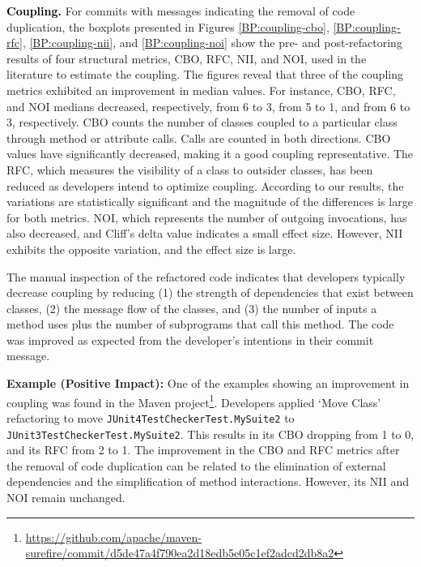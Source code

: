 \noindent\textbf{\textcolor{black}{Coupling.}} For commits with messages indicating the removal of code duplication, the boxplots presented in Figures \ref{BP:coupling-cbo}, \ref{BP:coupling-rfc}, \ref{BP:coupling-nii}, and \ref{BP:coupling-noi} show the pre- and post-refactoring results of four structural metrics, \ie CBO, RFC, NII, and NOI, used in the literature to estimate the coupling. The figures reveal that three of the coupling metrics exhibited an improvement in median values. For instance, CBO, RFC, and NOI medians decreased, respectively, from 6 to 3, from 5 to 1, and from 6 to 3, respectively. CBO counts the number of classes coupled to a particular class through method or attribute calls. Calls are counted in both directions. CBO values have significantly decreased, making it a good coupling representative.  The RFC, which measures the visibility of a class to outsider classes, has been reduced as developers intend to optimize coupling. According to our results, the variations are statistically significant and the magnitude of the differences is large for both metrics.  NOI, which represents the number of outgoing invocations, has also decreased, and Cliff’s delta value
indicates a small effect size. However, NII exhibits the opposite variation, and the effect size is large.

The manual inspection of the refactored code indicates that developers typically decrease coupling by reducing (1) the strength of dependencies that exist between classes, (2) the message flow of the classes, and (3) the number of inputs a method uses plus the number of subprograms that call this method. The code was improved as expected from the developer's intentions in their commit message.

\noindent\textbf{Example (Positive Impact):} One of the examples showing an improvement in coupling was found in the Maven project\footnote{\textcolor{black}{\url{https://github.com/apache/maven-surefire/commit/d5de47a4f790ea2d18edb5e05c1ef2adcd2db8a2}}}. Developers applied `Move Class' refactoring to move \texttt{JUnit4TestCheckerTest.MySuite2} to \texttt{JUnit3Test\break CheckerTest.MySuite2}. This results in its CBO dropping from 1 to 0, and its RFC from 2 to 1.  The improvement in the CBO and RFC metrics after the removal of code duplication can be related to the elimination of external dependencies and the simplification of method interactions. However, its NII and NOI remain unchanged.

